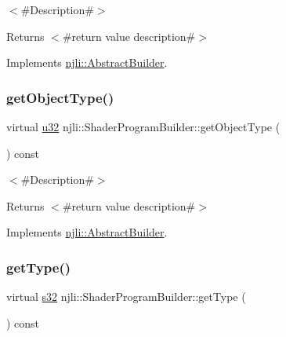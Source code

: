 $<$\#\+Description\#$>$

\begin{DoxyReturn}{Returns}
$<$\#return value description\#$>$ 
\end{DoxyReturn}


Implements \mbox{\hyperlink{classnjli_1_1_abstract_builder_a902f73ea78031b06aca183a417f3413b}{njli\+::\+Abstract\+Builder}}.

\mbox{\label{classnjli_1_1_shader_program_builder_a12234652d43de942922cec53b69956b3}} 
\subsubsection{\texorpdfstring{get\+Object\+Type()}{getObjectType()}}
{\footnotesize\ttfamily virtual \mbox{\hyperlink{_util_8h_a10e94b422ef0c20dcdec20d31a1f5049}{u32}} njli\+::\+Shader\+Program\+Builder\+::get\+Object\+Type (\begin{DoxyParamCaption}{ }\end{DoxyParamCaption}) const\hspace{0.3cm}{\ttfamily [virtual]}}

$<$\#\+Description\#$>$

\begin{DoxyReturn}{Returns}
$<$\#return value description\#$>$ 
\end{DoxyReturn}


Implements \mbox{\hyperlink{classnjli_1_1_abstract_builder_a0f2d344fcf697b167f4f2b1122b5fb33}{njli\+::\+Abstract\+Builder}}.

\mbox{\label{classnjli_1_1_shader_program_builder_a252394f97f129b953718c0b2713005e2}} 
\subsubsection{\texorpdfstring{get\+Type()}{getType()}}
{\footnotesize\ttfamily virtual \mbox{\hyperlink{_util_8h_aa62c75d314a0d1f37f79c4b73b2292e2}{s32}} njli\+::\+Shader\+Program\+Builder\+::get\+Type (\begin{DoxyParamCaption}{ }\end{DoxyParamCaption}) const\hspace{0.3cm}{\ttfamily [virtual]}}

